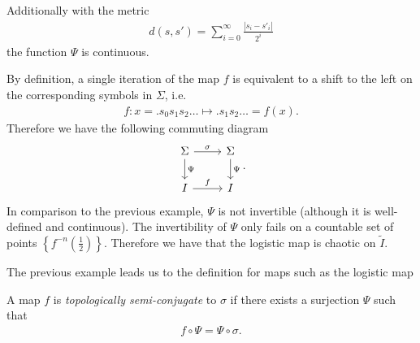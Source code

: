 \begin{ex}
 Additionally with the metric
 \begin{align}
	 d(s,s') = \sum_{i=0}^{\infty } \frac{|s_i - s'_i|}{2^{i}}	
 \end{align}
the function $\Psi$ is continuous. 

By definition, a single iteration of the map $f$ is equivalent to a shift to the left on the corresponding symbols in $\Sigma$, i.e.
\begin{align}
	f: x= \bm{.} s_0 s_1 s_2 \ldots \mapsto \bm{.} s_1 s_2 \ldots = f(x).
\end{align}
Therefore we have the following commuting diagram
\begin{equation}
\begin{tikzcd}
	\Sigma \arrow[r, "\sigma"] \arrow[d,"\Psi"] 
& \Sigma \arrow[d, "\Psi"] \\
I \arrow[r, "{f}"]
& I 
\end{tikzcd}.
\end{equation}
In comparison to the previous example, $\Psi$ is not invertible (although it is well-defined and continuous). The invertibility of $\Psi $ only fails on a countable set of points $\left \{ f^{-n}\left(\frac{1}{2}\right) \right \}$. Therefore we have that the logistic map is chaotic on $\tilde{I}$.
 \end{ex}

 The previous example leads us to the definition for maps such as the logistic map
\begin{definition}
	A map $f$ is \emph{topologically semi-conjugate} to $\sigma$ if there exists a surjection $\Psi$ such that
	\begin{align}
		\boxed{
			f \circ \Psi = \Psi \circ \sigma.
		}
	\end{align}
\end{definition}
 
